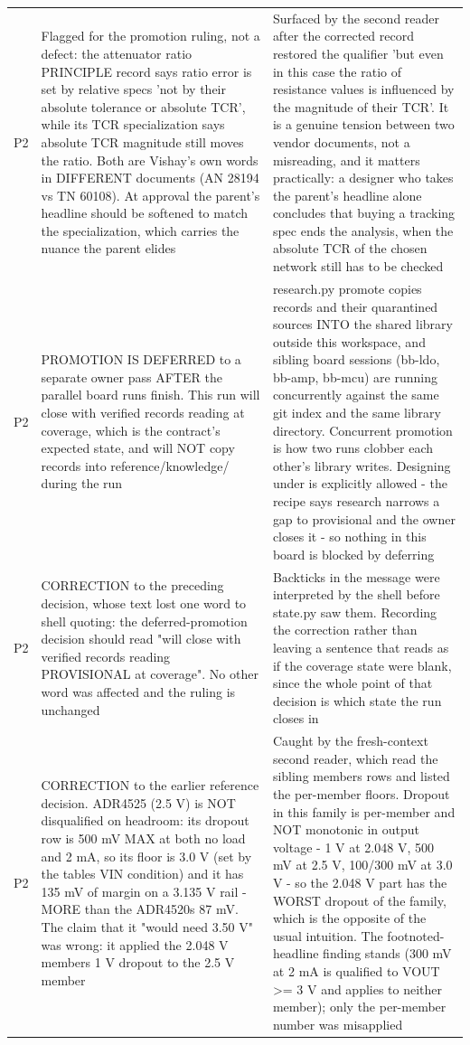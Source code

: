 \documentclass[11pt,a4paper]{article}
\begin{document}
{\begin{longtable}{lp{5.2cm}p{7.2cm}}
P2 & Flagged for the promotion ruling, not a defect: the attenuator ratio PRINCIPLE record says ratio error is set by relative specs 'not by their absolute tolerance or absolute TCR', while its TCR specialization says absolute TCR magnitude still moves the ratio. Both are Vishay's own words in DIFFERENT documents (AN 28194 vs TN 60108). At approval the parent's headline should be softened to match the specialization, which carries the nuance the parent elides & Surfaced by the second reader after the corrected record restored the qualifier 'but even in this case the ratio of resistance values is influenced by the magnitude of their TCR'. It is a genuine tension between two vendor documents, not a misreading, and it matters practically: a designer who takes the parent's headline alone concludes that buying a tracking spec ends the analysis, when the absolute TCR of the chosen network still has to be checked \\
P2 & PROMOTION IS DEFERRED to a separate owner pass AFTER the parallel board runs finish. This run will close with verified records reading  at coverage, which is the contract's expected state, and will NOT copy records into reference/knowledge/ during the run & research.py promote copies records and their quarantined sources INTO the shared library outside this workspace, and sibling board sessions (bb-ldo, bb-amp, bb-mcu) are running concurrently against the same git index and the same library directory. Concurrent promotion is how two runs clobber each other's library writes. Designing under  is explicitly allowed - the recipe says research narrows a gap to provisional and the owner closes it - so nothing in this board is blocked by deferring \\
P2 & CORRECTION to the preceding decision, whose text lost one word to shell quoting: the deferred-promotion decision should read "will close with verified records reading PROVISIONAL at coverage". No other word was affected and the ruling is unchanged & Backticks in the message were interpreted by the shell before state.py saw them. Recording the correction rather than leaving a sentence that reads as if the coverage state were blank, since the whole point of that decision is which state the run closes in \\
P2 & CORRECTION to the earlier reference decision. ADR4525 (2.5 V) is NOT disqualified on headroom: its dropout row is 500 mV MAX at both no load and 2 mA, so its floor is 3.0 V (set by the tables VIN condition) and it has 135 mV of margin on a 3.135 V rail - MORE than the ADR4520s 87 mV. The claim that it "would need 3.50 V" was wrong: it applied the 2.048 V members 1 V dropout to the 2.5 V member & Caught by the fresh-context second reader, which read the sibling members rows and listed the per-member floors. Dropout in this family is per-member and NOT monotonic in output voltage - 1 V at 2.048 V, 500 mV at 2.5 V, 100/300 mV at 3.0 V - so the 2.048 V part has the WORST dropout of the family, which is the opposite of the usual intuition. The footnoted-headline finding stands (300 mV at 2 mA is qualified to VOUT \textgreater{}= 3 V and applies to neither member); only the per-member number was misapplied \\

\end{longtable}}
\end{document}

